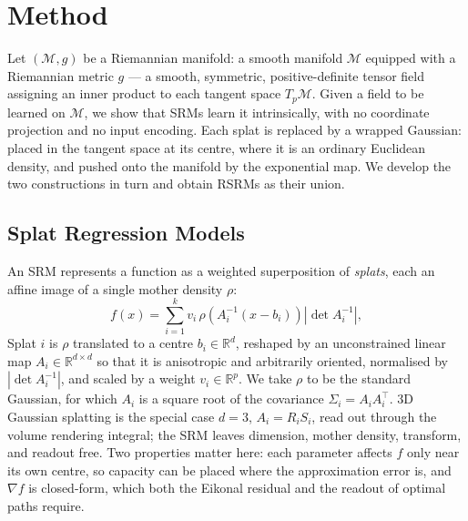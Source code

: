 
\section{Method}

Let $(\mathcal{M}, g)$ be a Riemannian manifold: a smooth manifold $\mathcal{M}$ equipped with a Riemannian metric $g$ --- a smooth, symmetric, positive-definite tensor field assigning an inner product to each tangent space $T_p\mathcal{M}$. Given a field to be learned on $\mathcal{M}$, we show that \acp{SRM} learn it intrinsically, with no coordinate projection and no input encoding. Each splat is replaced by a wrapped Gaussian: placed in the tangent space at its centre, where it is an ordinary Euclidean density, and pushed onto the manifold by the exponential map. We develop the two constructions in turn and obtain \acp{RSRM} as their union.

\subsection{Splat Regression Models}

An \ac{SRM} \cite{daniels2026splat} represents a function as a weighted superposition of \emph{splats}, each an affine image of a single mother density $\rho$:
\begin{equation}
    f(x) = \sum_{i=1}^{k} v_i \, \rho\!\left(A_i^{-1}(x - b_i)\right) \left| \det A_i^{-1} \right|,
    \label{eq:srm}
\end{equation}
Splat $i$ is $\rho$ translated to a centre $b_i \in \mathbb{R}^d$, reshaped by an unconstrained linear map $A_i \in \mathbb{R}^{d \times d}$ so that it is anisotropic and arbitrarily oriented, normalised by $|\det A_i^{-1}|$, and scaled by a weight $v_i \in \mathbb{R}^p$. We take $\rho$ to be the standard Gaussian, for which $A_i$ is a square root of the covariance $\Sigma_i = A_i A_i^\top$. 3D Gaussian splatting \cite{kerbl2023gaussiansplatting} is the special case $d=3$, $A_i = R_i S_i$, read out through the volume rendering integral; the \ac{SRM} leaves dimension, mother density, transform, and readout free. Two properties matter here: each parameter affects $f$ only near its own centre, so capacity can be placed where the approximation error is, and $\nabla f$ is closed-form, which both the Eikonal residual and the readout of optimal paths require.

